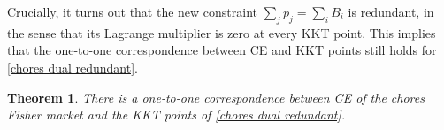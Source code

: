 \documentclass[format=acmsmall,authorversion]{acmart}
\newtheorem{theorem}{Theorem}
\newcommand{\rmedit}[1]{{\textcolor{purple}{#1}}}
\begin{document}
Crucially, it turns out that the new constraint $\sum_j p_j = \sum_i B_i$ is redundant, in the sense that its Lagrange multiplier is zero at every KKT point. This implies that the one-to-one correspondence between CE and KKT points still holds for \ref{chores dual redundant}.
\begin{theorem}
    There is a one-to-one correspondence between CE of the chores Fisher market and the KKT points of \ref{chores dual redundant}.
    \label{thm:dual EG redundant kkt correspondence}
\end{theorem}
\end{document}
